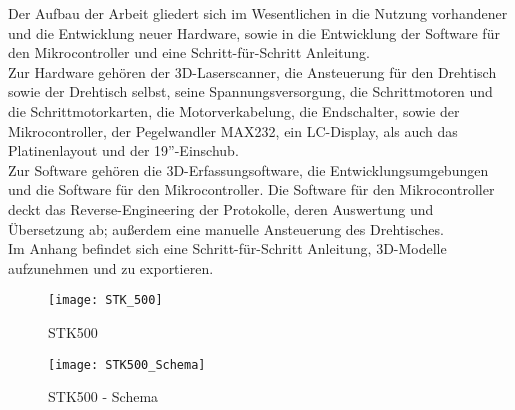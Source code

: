 Der Aufbau der Arbeit gliedert sich im Wesentlichen in die Nutzung vorhandener und die Entwicklung neuer Hardware, sowie in die Entwicklung der Software für den Mikrocontroller und eine Schritt-für-Schritt Anleitung. \\
Zur Hardware gehören der 3D-Laserscanner, die Ansteuerung für den Drehtisch sowie der Drehtisch selbst, seine Spannungsversorgung, die Schrittmotoren und die Schrittmotorkarten, die Motorverkabelung, die Endschalter, sowie der Mikrocontroller, der Pegelwandler MAX232, ein LC-Display, als auch das Platinenlayout und der 19''-Einschub.\\
Zur Software gehören die 3D-Erfassungsoftware, die Entwicklungsumgebungen und die Software für den Mikrocontroller. Die Software für den Mikrocontroller deckt das Reverse-Engineering der Protokolle, deren Auswertung und Übersetzung ab; außerdem eine manuelle Ansteuerung des Drehtisches.\\
Im Anhang befindet sich eine Schritt-für-Schritt Anleitung, 3D-Modelle aufzunehmen und zu exportieren.


\begin{figure}[htb]
\centering
\texttt{[image: STK\_500]}
\caption{STK500}
\label{fig:STK500}
\end{figure}
\begin{figure}[htb]
\centering
\texttt{[image: STK500\_Schema]}
\caption{STK500 - Schema}
\label{fig:STK500_Schema}
\end{figure}